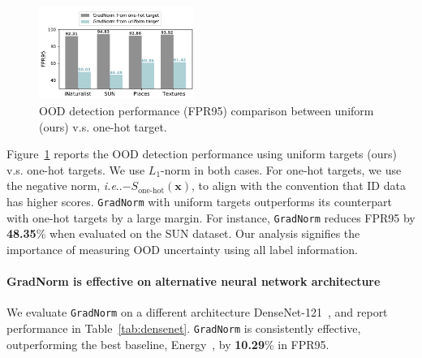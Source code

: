 \documentclass{article}
\makeatletter
\def\*#1{\mathbf{#1}}
\DeclareRobustCommand\onedot{\futurelet\@let@token\@onedot}
\def\@onedot{\ifx\@let@token.\else.\null\fi\xspace}
\def\ie{\emph{i.e}\onedot} \def\Ie{\emph{I.e}\onedot}
\makeatother
\begin{document}
\begin{figure}
\vspace{-0.6cm}
    \includegraphics[width=0.45\textwidth]{figures/traditional_ce_fpr95_green.pdf}
    \caption{\small{OOD detection performance (FPR95) comparison between uniform (ours) v.s. one-hot target.}}
    \vspace{-0.4cm}
    \label{fig:traditional_ce_fpr95}
\end{figure}



Figure~\ref{fig:traditional_ce_fpr95} reports the OOD detection performance using uniform targets (ours) v.s. one-hot targets. We use $L_1$-norm in both cases. For one-hot targets, we use the negative norm, \ie $-S_\text{one-hot}(\*x)$, to align with the convention that ID data has higher scores. \texttt{GradNorm} with uniform targets outperforms its counterpart with one-hot targets by a large margin. For instance, \texttt{GradNorm} reduces FPR95 by \textbf{48.35}\% when evaluated on the SUN dataset. Our analysis signifies the importance of measuring OOD uncertainty using all label information.




\paragraph{GradNorm is effective on alternative neural network architecture} We evaluate \texttt{GradNorm} on a different architecture DenseNet-121~\cite{huang2017densely}, and report performance in Table~\ref{tab:densenet}. \texttt{GradNorm} is consistently effective, outperforming the best baseline, Energy~\cite{liu2020energy}, by \textbf{10.29}\% in FPR95. 
\end{document}
